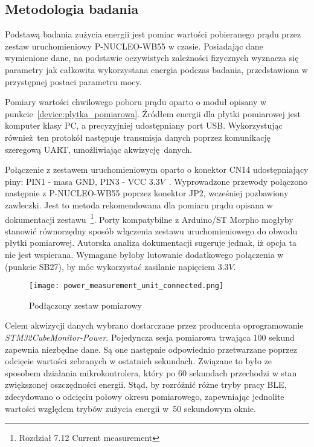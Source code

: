 \subsection{Metodologia badania}

Podstawą badania zużycia energii jest pomiar wartości pobieranego prądu przez zestaw uruchomieniowy
P-NUCLEO-WB55 w czasie. Posiadając dane wymienione dane, na podstawie oczywistych
zależności fizycznych wyznacza się parametry jak całkowita wykorzystana energia
podczas badania, przedstawiona w przystępnej postaci parametru mocy.

Pomiary wartości chwilowego poboru prądu oparto o moduł opisany w punkcie~\ref{device:plytka_pomiarowa}.
Źródłem energii dla płytki pomiarowej jest komputer klasy PC, a precyzyjniej udostępniany
port USB. Wykorzystując również ten protokół następuje transmisja danych poprzez komunikację szeregową
UART, umożliwiając akwizycję danych.

Połączenie z zestawem uruchomieniowym oparto o konektor CN14 udostępniający piny: PIN1 - masa GND, PIN3 - VCC $3.3V$~\cite{noauthor_um2243_2018}.
Wyprowadzone przewody połączono następnie z P-NUCLEO-WB55 poprzez konektor JP2, wcześniej pozbawiony zawleczki.
Jest to metoda rekomendowana dla pomiaru prądu opisana w dokumentacji zestawu~\cite{stmicroelectronics_um2435_2019}\footnote{
Rozdział 7.12 Current measurement}. Porty kompatybilne z Arduino/ST Morpho mogłyby stanowić równorzędny sposób
włączenia zestawu uruchomieniowego do obwodu płytki pomiarowej. Autorska analiza dokumentacji sugeruje jednak,
iż opcja ta nie jest wspierana. Wymagane byłoby lutowanie dodatkowego połączenia w (punkcie SB27), by móc wykorzystać
zasilanie napięciem $3.3V$.

\begin{figure}[!htb]
	\centering \texttt{[image: power\_measurement\_unit\_connected.png]}
	\caption{Podłączony zestaw pomiarowy}
	\label{rys:connected_power_measurement_unit}
\end{figure}

Celem akwizycji danych wybrano dostarczane przez producenta oprogramowanie \textit{STM32CubeMonitor-Power}.
Pojedyncza sesja pomiarowa trwająca 100 sekund zapewnia niezbędne dane. Są one następnie
odpowiednio przetwarzane poprzez odcięcie wartości zebranych w ostatnich sekundach. Związane to było
ze sposobem działania mikrokontrolera, który po 60 sekundach przechodzi w stan zwiększonej
oszczędności energii. Stąd, by rozróżnić różne tryby pracy \gls{BLE}, zdecydowano o odcięciu
połowy okresu pomiarowego, zapewniając jednolite wartości względem trybów zużycia energii
w~50 sekundowym oknie.

